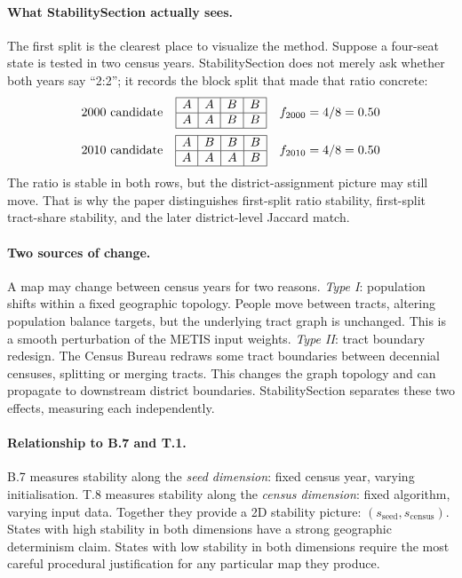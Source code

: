 \paragraph{What StabilitySection actually sees.}
The first split is the clearest place to visualize the method.  Suppose a
four-seat state is tested in two census years.  StabilitySection does not merely
ask whether both years say ``2:2''; it records the block split that made that
ratio concrete:
\[
\begin{array}{c@{\quad}c@{\quad}c}
\text{2000 candidate} &
\begin{array}{|c|c|c|c|}
\hline
A & A & B & B\\
\hline
A & A & B & B\\
\hline
\end{array}
&
f_{2000}=4/8=0.50\\[1.2em]
\text{2010 candidate} &
\begin{array}{|c|c|c|c|}
\hline
A & B & B & B\\
\hline
A & A & A & B\\
\hline
\end{array}
&
f_{2010}=4/8=0.50
\end{array}
\]
The ratio is stable in both rows, but the district-assignment picture may still
move.  That is why the paper distinguishes first-split ratio stability,
first-split tract-share stability, and the later district-level Jaccard match.

\paragraph{Two sources of change.}
A map may change between census years for two reasons.
\emph{Type I}: population shifts within a fixed geographic topology.
People move between tracts, altering population balance targets, but the
underlying tract graph is unchanged.
This is a smooth perturbation of the METIS input weights.
\emph{Type II}: tract boundary redesign.
The Census Bureau redraws some tract boundaries between decennial censuses,
splitting or merging tracts.
This changes the graph topology and can propagate to downstream district
boundaries.
StabilitySection separates these two effects, measuring each independently.

\paragraph{Relationship to B.7 and T.1.}
B.7 measures stability along the \emph{seed dimension}: fixed census year,
varying initialisation.
T.8 measures stability along the \emph{census dimension}: fixed algorithm,
varying input data.
Together they provide a 2D stability picture:
$(s_\text{seed}, s_\text{census})$.
States with high stability in both dimensions have a strong geographic
determinism claim.
States with low stability in both dimensions require the most careful
procedural justification for any particular map they produce.

